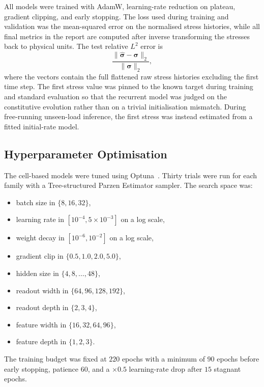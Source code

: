 \documentclass[11pt,a4paper]{article}
\begin{document}
All models were trained with AdamW, learning-rate reduction on plateau, gradient clipping, and early stopping. The loss used during training and validation was the mean-squared error on the normalised stress histories, while all final metrics in the report are computed after inverse transforming the stresses back to physical units. The test relative $L^2$ error is
\begin{equation}
\frac{\lVert \hat{\bm{\sigma}}-\bm{\sigma}\rVert_2}{\lVert \bm{\sigma}\rVert_2},
\label{eq:relative_l2}
\end{equation}
where the vectors contain the full flattened raw stress histories excluding the first time step. The first stress value was pinned to the known target during training and standard evaluation so that the recurrent model was judged on the constitutive evolution rather than on a trivial initialisation mismatch. During free-running unseen-load inference, the first stress was instead estimated from a fitted initial-rate model.

\subsection{Hyperparameter Optimisation}

The cell-based models were tuned using Optuna~\cite{optuna_2019}. Thirty trials were run for each family with a Tree-structured Parzen Estimator sampler. The search space was:
\begin{itemize}[leftmargin=1.5em]
    \item batch size in $\{8,16,32\}$,
    \item learning rate in $[10^{-4},5\times 10^{-3}]$ on a log scale,
    \item weight decay in $[10^{-6},10^{-2}]$ on a log scale,
    \item gradient clip in $\{0.5,1.0,2.0,5.0\}$,
    \item hidden size in $\{4,8,\dots,48\}$,
    \item readout width in $\{64,96,128,192\}$,
    \item readout depth in $\{2,3,4\}$,
    \item feature width in $\{16,32,64,96\}$,
    \item feature depth in $\{1,2,3\}$.
\end{itemize}
The training budget was fixed at $220$ epochs with a minimum of $90$ epochs before early stopping, patience $60$, and a $\times 0.5$ learning-rate drop after $15$ stagnant epochs.
\end{document}
